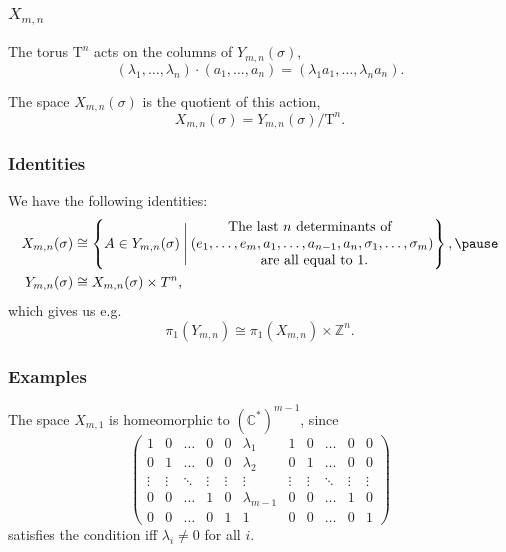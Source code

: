 \documentclass{beamer} %
\newcommand{\Z}{\mathbb{Z}}
\newcommand{\C}{\mathbb{C}}
\newcommand{\delim}{\:}
\newcommand{\T}{\mathrm{T}}
\newcommand{\set}[1]{\left\{ #1 \right\}}
\renewcommand{\l}{\lambda}
\begin{document}
\begin{frame}
  \frametitle{$X_{m,n}$}
  The torus $\T^n$ acts on the columns of $Y_{m,n}(\sigma)$,
  \[ (\l_1,\dots,\l_n) \cdot (a_1,\dots,a_n) = (\l_1 a_1,\dots, \l_n
  a_n). \]
  \pause
  \begin{definition}
    The space $X_{m,n}(\sigma)$ is the quotient of this action,
    \[ X_{m,n}(\sigma) = Y_{m,n}(\sigma) / \T^n. \]
  \end{definition}
\end{frame}

\begin{frame}
  \frametitle{Identities}
  We have the following identities:
  \begin{align*}
    X_{m,n}(\sigma) &\cong \set{ A \in Y_{m,n}(\sigma)
                      \delim\Bigg\vert\delim
                      \begin{matrix}
                                  \text{The last } n \text{
                                    determinants of } \\
                                  (e_1,\dots,e_m,a_1,\dots,a_{n-1},a_n,
                                  \sigma_1,\dots,\sigma_m) \\
                                  \text{ are all equal to 1.}
                      \end{matrix} }, \pause \\
    Y_{m,n}(\sigma) &\cong X_{m,n}(\sigma)\times T^n,
  \end{align*}
  which gives us e.g.
  \[ \pi_1(Y_{m,n}) \cong \pi_1(X_{m,n})\times \Z^n. \]
\end{frame}

\begin{frame}
  \frametitle{Examples}
    \begin{example}
    The space $X_{m,1}$ is homeomorphic to $(\C^*)^{m-1}$,
    since
    \[ \begin{pmatrix}
      1&0&\dots&0&0&\l_1&1&0&\dots&0&0 \\
      0&1&\dots&0&0&\l_2&0&1&\dots&0&0 \\
      \vdots&\vdots&\ddots&\vdots&\vdots&\vdots&\vdots&\vdots&
      \ddots&\vdots&\vdots\\
      0&0&\dots&1&0&\l_{m-1}&0&0&\dots&1&0 \\
      0&0&\dots&0&1&1&0&0&\dots&0&1
    \end{pmatrix} \]
    satisfies the condition iff $\l_i \neq 0$ for all $i$.
  \end{example}
\end{frame}
\end{document}
